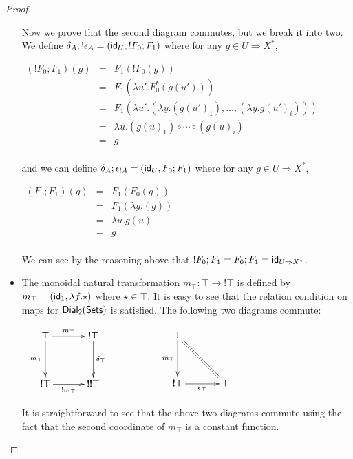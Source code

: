 \begin{proof}
\begin{center}
\begin{itemize}
      Now we prove that the second diagram commutes, but we break it
      into two.  
      We define $\delta_A;!\epsilon_A = (\mathsf{id}_U,!F_0;F_1)$ where for
      any $g \in U \Rightarrow X^*$,
      \begin{center}
        \begin{math}
          \begin{array}{lll}
            (!F_0;F_1)(g) 
            & = & F_1(!F_0(g))\\
            & = & F_1(\lambda u'.F_0^*(g(u')))\\
            & = & F_1(\lambda u'.(\lambda y.(g(u')_1),\ldots,(\lambda y.g(u')_i)))\\
            & = & \lambda u.(g(u)_1) \circ \cdots \circ (g(u)_i)\\
            & = & g\\
          \end{array}
        \end{math}
      \end{center}
      and we can define $\delta_A;\epsilon_{!A} = (\mathsf{id}_U,F_0;F_1)$ where for
      any $g \in U \Rightarrow X^*$,
      \begin{center}
        \begin{math}
          \begin{array}{lll}
            (F_0;F_1)(g) 
            & = & F_1(F_0(g))\\
            & = & F_1(\lambda y.(g))\\
            & = & \lambda u.g(u)\\
            & = & g\\
          \end{array}
        \end{math}
      \end{center}
      We can see by the reasoning above that
      $!F_0;F_1 = F_0;F_1 = \mathsf{id}_{U \Rightarrow X^*}$.

    \item The monoidal natural transformation $m_{\top} : \top \to !\top$
      is defined by $m_{\top} = (\mathsf{id}_1,\lambda f.\star)$ where $\star \in \top$. 
      It is easy to see that the relation condition
      on maps for $\mathsf{Dial_2}(\mathsf{Sets})$ is satisfied.  The following two diagrams
      commute:
      \begin{center}
        \begin{math}
          \begin{array}{lll}
            \bfig
            \square[\top`!\top`!\top`!!\top;m_\top`m_\top`\delta_\top`!m_\top]
            \efig
            &
              \,\,\,\,\,\,\,\,\,\,\,\,\,\,\,\,\,\,\,\,
            &
              \bfig
              \btriangle/->`=`->/[\top`!\top`\top;m_\top``\epsilon_{\top}]
           \efig
          \end{array}
        \end{math}
      \end{center}
      It is straightforward to see that the above two diagrams commute
      using the fact that the second coordinate of $m_\top$ is a
      constant function.


\end{itemize}
\end{center}
\end{proof}
